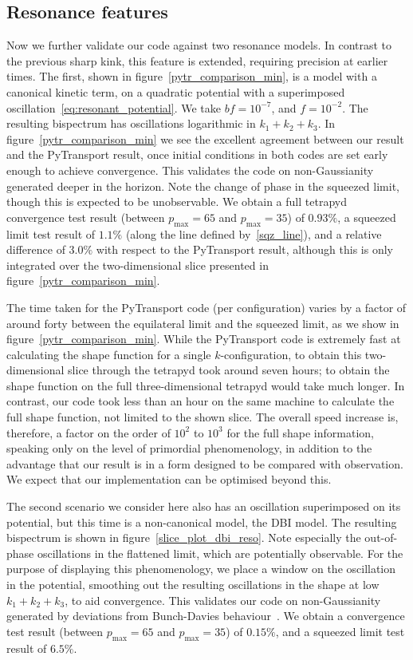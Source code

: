 \documentclass[a4paper,12pt]{extarticle}
\newcommand{\Pmax}{p_\text{max}}
\begin{document}
\subsection{Resonance features}
Now we further validate our code against two
resonance models. In contrast to the previous sharp kink,
this feature is extended, requiring precision at earlier times.
The first, shown in figure~\ref{pytr_comparison_min},
is a model with a canonical kinetic term, on a
quadratic potential with a superimposed
oscillation~\eqref{eq:resonant_potential}.
We take $bf=10^{-7}$, and $f=10^{-2}$.
The resulting bispectrum has oscillations logarithmic in $k_1+k_2+k_3$.
In figure~\ref{pytr_comparison_min} we see the excellent agreement
between our result and the PyTransport result, once initial conditions
in both codes are set early enough to achieve convergence.
This validates the code on non-Gaussianity generated deeper
in the horizon. Note the change of phase in the squeezed limit,
though this is expected to be unobservable.
We obtain a full tetrapyd convergence test result
(between $\Pmax=65$ and $\Pmax=35$)
of $0.93\%$, a squeezed limit test result of $1.1\%$
(along the line defined by~\eqref{sqz_line}),
and a relative difference of $3.0\%$ with respect to the
PyTransport result,
although this is only integrated over the two-dimensional slice presented in
figure~\ref{pytr_comparison_min}.


The time taken for the PyTransport code (per configuration) varies by a factor of around forty
between the equilateral limit and the squeezed limit,
as we show in figure~\ref{pytr_comparison_min}.
While the PyTransport code is extremely fast at calculating the shape function
for a single $k$-configuration,
to obtain this two-dimensional slice through the tetrapyd took around seven hours;
to obtain the shape function on the full three-dimensional tetrapyd would take much longer.
In contrast, our code took less than an hour on the same machine to calculate
the full shape function, not limited to the shown slice.
The overall speed increase is, therefore, a factor on the order of $10^2$ to $10^3$
for the full shape information, speaking only on the level of primordial
phenomenology, in addition to the advantage that our result is in a form
designed to be compared with observation.
We expect that our implementation can be optimised beyond this.


The second scenario we consider here also has an
oscillation superimposed on its potential, but this time
is a non-canonical model, the DBI model.
The resulting bispectrum is shown in figure~\ref{slice_plot_dbi_reso}.
Note especially the out-of-phase oscillations in the flattened limit,
which are potentially observable.
For the purpose of displaying this phenomenology, we place a window
on the oscillation in the potential, smoothing out the resulting oscillations
in the shape at low $k_1+k_2+k_3$, to aid convergence.
This validates our code on non-Gaussianity generated by deviations from Bunch-Davies
behaviour~\cite{chen_folded_resonant,features_bartolo}.
We obtain a convergence test result (between $\Pmax=65$ and $\Pmax=35$)
of $0.15\%$, and a squeezed limit test result of $6.5\%$.
\end{document}
